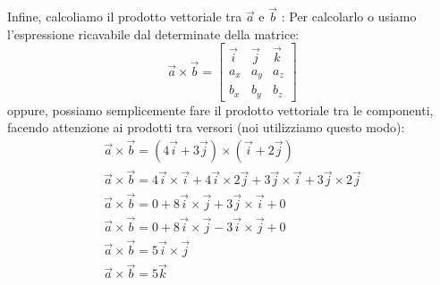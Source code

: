 Infine, calcoliamo il prodotto vettoriale tra $ \overrightarrow{a} $ e $ \overrightarrow{b} $ :
Per calcolarlo o usiamo l'espressione ricavabile dal determinate della matrice:
$$ \overrightarrow{a} \times \overrightarrow{b} = \begin{bmatrix}
\overrightarrow{i} & \overrightarrow{j} & \overrightarrow{k} \\
a_{x} & a_{y} & a_{z} \\
b_{x} & b_{y} & b_{z}
\end{bmatrix} $$
oppure, possiamo semplicemente fare il prodotto vettoriale tra le componenti, facendo attenzione ai prodotti tra versori (noi utilizziamo questo modo):
\begin{align*}
\overrightarrow{a} \times \overrightarrow{b} = ( 4 \overrightarrow{i} + 3 \overrightarrow{j} ) \times ( \overrightarrow{i} + 2 \overrightarrow{j} ) \\
\overrightarrow{a} \times \overrightarrow{b} = 4 \overrightarrow{i} \times \overrightarrow{i} + 4\overrightarrow{i} \times 2 \overrightarrow{j} + 3 \overrightarrow{j} \times \overrightarrow{i} + 3 \overrightarrow{j} \times 2 \overrightarrow{j} \\
\overrightarrow{a} \times \overrightarrow{b} = 0 + 8 \overrightarrow{i} \times \overrightarrow{j} + 3 \overrightarrow{j} \times \overrightarrow{i} + 0 \\
\overrightarrow{a} \times \overrightarrow{b} = 0 + 8\overrightarrow{i} \times \overrightarrow{j} - 3 \overrightarrow{i} \times \overrightarrow{j} + 0 \\
\overrightarrow{a} \times \overrightarrow{b} = 5 \overrightarrow{i} \times \overrightarrow{j} \\
\overrightarrow{a} \times \overrightarrow{b} = 5 \overrightarrow{k}
\end{align*}
